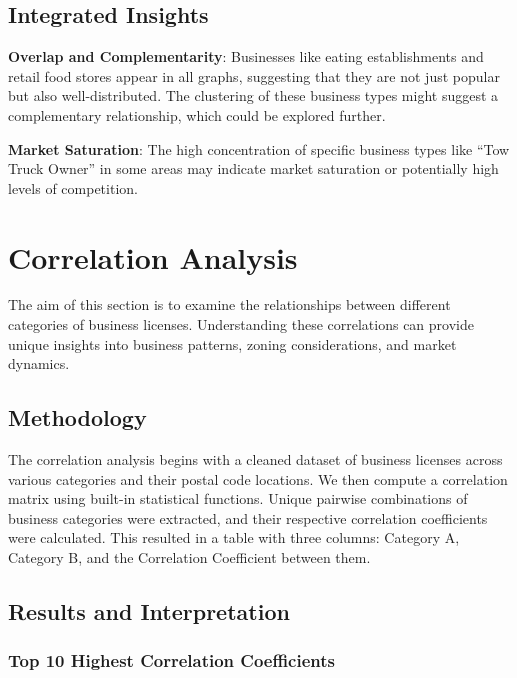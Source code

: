 \documentclass[
]{article}
\begin{document}
\hypertarget{integrated-insights}{%
\subsection{Integrated Insights}\label{integrated-insights}}

\textbf{Overlap and Complementarity}: Businesses like eating establishments and retail food stores appear in all graphs, suggesting that they are not just popular but also well-distributed. The clustering of these business types might suggest a complementary relationship, which could be explored further.

\textbf{Market Saturation}: The high concentration of specific business types like ``Tow Truck Owner'' in some areas may indicate market saturation or potentially high levels of competition.

\hypertarget{correlation-analysis}{%
\section{Correlation Analysis}\label{correlation-analysis}}

The aim of this section is to examine the relationships between different categories of business licenses. Understanding these correlations can provide unique insights into business patterns, zoning considerations, and market dynamics.

\hypertarget{methodology}{%
\subsection{Methodology}\label{methodology}}

The correlation analysis begins with a cleaned dataset of business licenses across various categories and their postal code locations. We then compute a correlation matrix using built-in statistical functions. Unique pairwise combinations of business categories were extracted, and their respective correlation coefficients were calculated. This resulted in a table with three columns: Category A, Category B, and the Correlation Coefficient between them.

\hypertarget{results-and-interpretation}{%
\subsection{Results and Interpretation}\label{results-and-interpretation}}

\hypertarget{top-10-highest-correlation-coefficients}{%
\subsubsection{Top 10 Highest Correlation Coefficients}\label{top-10-highest-correlation-coefficients}}
\end{document}
